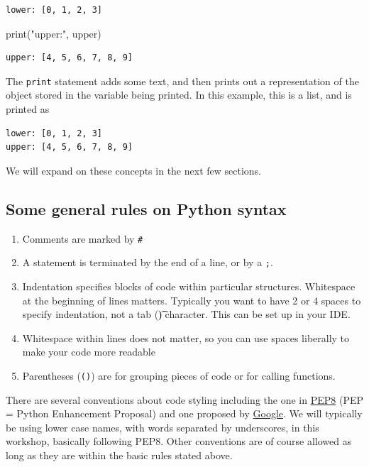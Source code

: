 \documentclass[
  letterpaper,
]{scrbook}
\newenvironment{Shaded}{\begin{snugshade}}{\end{snugshade}}
\newcommand{\BuiltInTok}[1]{#1}
\newcommand{\NormalTok}[1]{#1}
\newcommand{\StringTok}[1]{\textcolor[rgb]{0.31,0.60,0.02}{#1}}
\providecommand{\tightlist}{%
  \setlength{\itemsep}{0pt}\setlength{\parskip}{0pt}}
\begin{document}
\begin{verbatim}
lower: [0, 1, 2, 3]
\end{verbatim}

\begin{Shaded}
\begin{Highlighting}[]
\BuiltInTok{print}\NormalTok{(}\StringTok{"upper:"}\NormalTok{, upper)}
\end{Highlighting}
\end{Shaded}

\begin{verbatim}
upper: [4, 5, 6, 7, 8, 9]
\end{verbatim}

The \texttt{print} statement adds some text, and then prints out a representation of the object stored in the variable being printed. In this example, this is a list, and is printed as

\begin{verbatim}
lower: [0, 1, 2, 3]
upper: [4, 5, 6, 7, 8, 9]
\end{verbatim}

We will expand on these concepts in the next few sections.

\hypertarget{some-general-rules-on-python-syntax}{%
\subsection{Some general rules on Python syntax}\label{some-general-rules-on-python-syntax}}

\begin{enumerate}
\def\labelenumi{\arabic{enumi}.}
\tightlist
\item
  Comments are marked by \texttt{\#}
\item
  A statement is terminated by the end of a line, or by a \texttt{;}.
\item
  Indentation specifies blocks of code within particular structures. Whitespace at the beginning of lines matters. Typically you want to have 2 or 4 spaces to specify indentation, not a tab (\t) character. This can be set up in your IDE.
\item
  Whitespace within lines does not matter, so you can use spaces liberally to make your code more readable
\item
  Parentheses (\texttt{()}) are for grouping pieces of code or for calling functions.
\end{enumerate}

There are several conventions about code styling including the one in \href{https://www.python.org/dev/peps/pep-0008/\#function-and-variable-names}{PEP8} (PEP = Python Enhancement Proposal) and one proposed by \href{https://google.github.io/styleguide/pyguide.html\#316-naming}{Google}. We will typically be using lower case names, with words separated by underscores, in this workshop, basically following PEP8. Other conventions are of course allowed as long as they are within the basic rules stated above.
\end{document}
